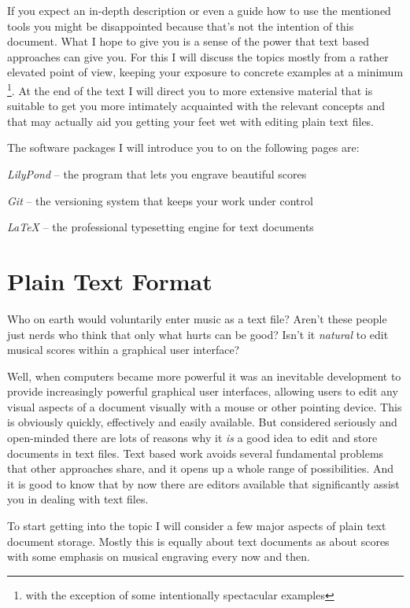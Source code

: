 \documentclass[../../LilyPond-Tutorials]{subfiles}
\begin{document}
If you expect an in-depth description or even a guide how to use the mentioned tools you might be disappointed because that's not the intention of this document.
What I hope to give you is a sense of the power that text based approaches can give you.
For this I will discuss the topics mostly from a rather elevated point of view, keeping your exposure to concrete examples at a minimum%
\footnote{with the exception of some intentionally spectacular examples}.
At the end of the text I will direct you to more extensive material that is suitable to get you more intimately acquainted with the relevant concepts and that may actually aid you getting your feet wet with editing plain text files.

The software packages I will introduce you to on the following pages are:
\begin{itemize*}
\item \emph{LilyPond} -- the program that lets you engrave beautiful scores
\item \emph{Git} -- the versioning system that keeps your work under control
\item \emph{\LaTeX} -- the professional typesetting engine for text documents
\end{itemize*}

\chapter{Plain Text Format}
\label{chap:pt_plain-text-format}
Who on earth would voluntarily enter music as a text file?
Aren't these people just nerds who think that only what hurts can be good?
Isn't it \emph{natural} to edit musical scores within a graphical user interface?

Well, when computers became more powerful it was an inevitable development to provide increasingly powerful graphical user interfaces, allowing users to edit any visual aspects of a document visually with a mouse or other pointing device.
This is obviously quickly, effectively and easily available.
But considered seriously and open-minded there are lots of reasons why it \emph{is} a good idea to edit and store documents in text files.
Text based work avoids several fundamental problems that other approaches share, and it opens up a whole range of possibilities.
And it is good to know that by now there are editors available that significantly assist you in dealing with text files.

To start getting into the topic I will consider a few major aspects of plain text document storage.
Mostly this is equally about text documents as about scores with some emphasis on musical engraving every now and then.
\end{document}

